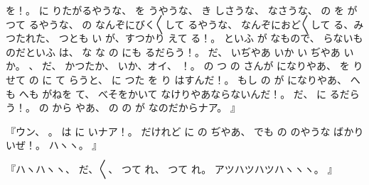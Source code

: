 を！。
に
りたがるやうな、
を
うやうな、
き
しさうな、
なさうな、
の
を
がつて
るやうな、
の
なんぞにびく〳〵して
るやうな、
なんぞにおど〳〵して
る、みつたれた、
つとも
い
が、すつかり
えて
る！。
といふ
が
なもので、
らないものだといふ
は、
な
な
の
にも
るだらう！。
だ、
いぢやあ
いか
い
ぢやあ
いか。
、
だ、
かつたか、
いか、オイ、
！。
の
つ
の
さんが
になりやあ、
を
り
せて
の
に
て
らうと、
に
つた
を
り
はすんだ！。
もし
の
が
になりやあ、
へも
へも
がねを
て、
べそをかいて
なけりやあならないんだ！。
だ、
に
るだらう！。
の
から
やあ、
の
の
が
なのだからナア。
』

『ウン、
。
は
に
いナア！。
だけれど
に%
の
ぢやあ、
でも
の
のやうな
ばかり
いぜ！。
ハヽヽ。
』

『ハヽハヽヽ、
だ、〳〵、
つて
れ、
つて
れ。
アツハツハツハヽヽヽ。
』

